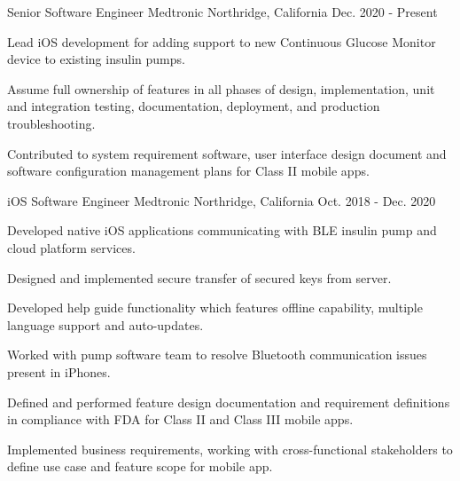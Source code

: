 

\begin{cventries}

  \cventry
    {Senior Software Engineer} %
    {Medtronic} %
    {Northridge, California} %
    {Dec. 2020 - Present} %
    {
      \begin{cvitems} %
        \item {Lead iOS development for adding support to new Continuous Glucose Monitor device to existing insulin pumps.}
        \item {Assume full ownership of features in all phases of design, implementation, unit and integration testing, documentation, deployment, and production troubleshooting.}
        \item {Contributed to system requirement software, user interface design document and software configuration management plans for Class II mobile apps.}
      \end{cvitems}
    }

  \cventry
    {iOS Software Engineer} %
    {Medtronic} %
    {Northridge, California} %
    {Oct. 2018 - Dec. 2020} %
    {
      \begin{cvitems} %
        \item {Developed native iOS applications communicating with BLE insulin pump and cloud platform services.}
        \item {Designed and implemented secure transfer of secured keys from server.}
        \item {Developed help guide functionality which features offline capability, multiple language support and auto-updates.}
        \item {Worked with pump software team to resolve Bluetooth communication issues present in iPhones.}
        \item {Defined and performed feature design documentation and requirement definitions in compliance with FDA for Class II and Class III mobile apps.}
        \item {Implemented business requirements, working with cross-functional stakeholders to define use case and feature scope for mobile app.}
      \end{cvitems}
    }


\end{cventries}
